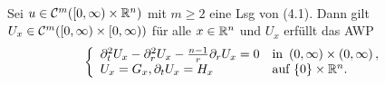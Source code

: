 \documentclass{cheat-sheet}
\begin{document}
\begin{lem}\mbox{}\\
  Sei $u \in \mathcal{C}^m(\left[ 0, \infty \right) \times \mathbb{R}^n)$ mit $m \geq 2$ eine Lsg von (4.1). Dann gilt $U_x \in \mathcal{C}^m(\left[ 0, \infty \right) \times \left[ 0, \infty \right))$ für alle $x \in \mathbb{R}^n$ und $U_x$ erfüllt das AWP
  \[
    \left\{ \begin{array}{ll}
      \partial_t^2 U_x - \partial_r^2 U_x - \tfrac{n-1}{r} \partial_r U_x = 0 & \text{in } \left( 0, \infty \right) \times \left( 0, \infty \right),\\
      U_x = G_x, \partial_t U_x = H_x & \text{auf } \{ 0 \} \times \mathbb{R}^n.
    \end{array} \right.
  \]
\end{lem}
\end{document}
